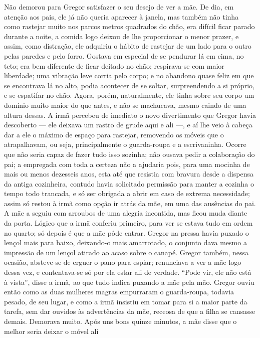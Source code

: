 Não demorou para Gregor satisfazer o seu desejo de ver a mãe. De dia, em
atenção aos pais, ele já não queria aparecer à janela, mas também não
tinha como rastejar muito nos parcos metros quadrados do chão, era difícil
ficar parado durante a noite, a comida logo deixou de lhe proporcionar o
menor prazer, e assim, como distração, ele adquiriu o hábito de rastejar
de um lado para o outro pelas paredes e pelo forro. Gostava em especial de
se pendurar lá em cima, no teto; era bem diferente de ficar deitado no
chão; respirava-se com maior liberdade; uma vibração leve corria pelo
corpo; e no abandono quase feliz em que se encontrava lá no alto, podia
acontecer de se soltar, surpreendendo a si próprio, e se espatifar no
chão. Agora, porém, naturalmente, ele tinha sobre seu corpo um domínio
muito maior do que antes, e não se machucava, mesmo caindo de uma altura
dessas. A irmã percebeu de imediato o novo divertimento que Gregor havia
descoberto --- ele deixava um rastro de grude aqui e ali ---, e aí lhe veio à
cabeça dar a ele o máximo de espaço para rastejar, removendo os móveis que
o atrapalhavam, ou seja, principalmente o guarda-roupa e a escrivaninha.
Ocorre que não seria capaz de fazer tudo isso sozinha; não ousava pedir a
colaboração do pai; a empregada com toda a certeza não a ajudaria pois,
para uma mocinha de mais ou menos dezesseis anos, esta até que resistia
com bravura desde a dispensa da antiga cozinheira, contudo havia
solicitado permissão para manter a cozinha o tempo todo trancada, e só ser
obrigada a abrir em caso de extrema necessidade; assim só restou à irmã
como opção ir atrás da mãe, em uma das ausências do pai. A mãe a seguiu
com arroubos de uma alegria incontida, mas ficou muda diante da porta.
Lógico que a irmã conferiu primeiro, para ver se estava tudo em ordem no
quarto; só depois é que a mãe pôde entrar. Gregor na pressa havia puxado o
lençol mais para baixo, deixando-o mais amarrotado, o conjunto dava mesmo
a impressão de um lençol atirado ao acaso sobre o canapé. Gregor também,
nessa ocasião, absteve-se de erguer o pano para espiar; renunciava a ver a
mãe logo dessa vez, e contentava-se só por ela estar ali de verdade. “Pode
vir, ele não está à vista”, disse a irmã, ao que tudo indica puxando a mãe
pela mão. Gregor ouviu então como as duas mulheres magras empurraram o
guarda-roupa, todavia pesado, de seu lugar, e como a irmã insistiu em
tomar para si a maior parte da tarefa, sem dar ouvidos às advertências da
mãe, receosa de que a filha se cansasse demais. Demorava muito. Após uns
bons quinze minutos, a mãe disse que o melhor seria deixar o móvel ali

